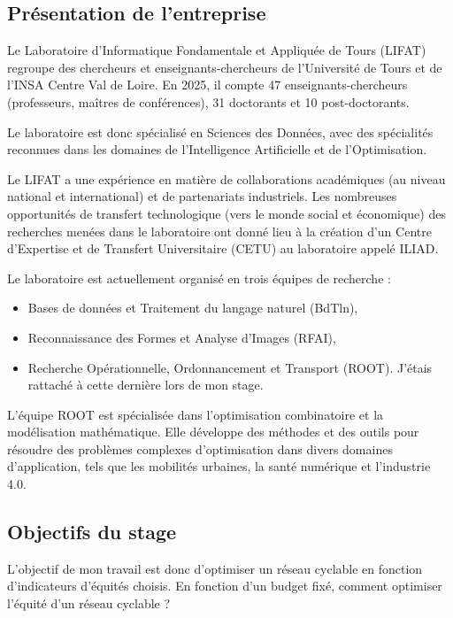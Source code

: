 \subsection{Présentation de l'entreprise}

Le Laboratoire d'Informatique Fondamentale et Appliquée de Tours (LIFAT) \cite{lifat} regroupe des chercheurs et enseignants-chercheurs de l'Université de Tours et de l'INSA Centre Val de Loire. En 2025, il compte 47 enseignants-chercheurs (professeurs, maîtres de conférences), 31 doctorants et 10 post-doctorants.

Le laboratoire est donc spécialisé en Sciences des Données, avec des spécialités reconnues dans les domaines de l'Intelligence Artificielle et de l'Optimisation.

Le LIFAT a une expérience en matière de collaborations académiques (au niveau national et international) et de partenariats industriels. Les nombreuses opportunités de transfert technologique (vers le monde social et économique) des recherches menées dans le laboratoire ont donné lieu à la création d'un Centre d'Expertise et de Transfert Universitaire (CETU) au laboratoire appelé ILIAD.

Le laboratoire est actuellement organisé en trois équipes de recherche :

\begin{itemize}
    \item Bases de données et Traitement du langage naturel (BdTln),
    \item Reconnaissance des Formes et Analyse d'Images (RFAI),
    \item Recherche Opérationnelle, Ordonnancement et Transport (ROOT). J'étais rattaché à cette dernière lors de mon stage.
\end{itemize}

L'équipe ROOT est spécialisée dans l'optimisation combinatoire et la modélisation mathématique. Elle développe des méthodes et des outils pour résoudre des problèmes complexes d'optimisation dans divers domaines d'application, tels que les mobilités urbaines, la santé numérique et l'industrie 4.0.

\subsection{Objectifs du stage}

L'objectif de mon travail est donc d'optimiser un réseau cyclable en fonction d'indicateurs d'équités choisis. En fonction d'un budget fixé, comment optimiser l'équité d'un réseau cyclable ?
